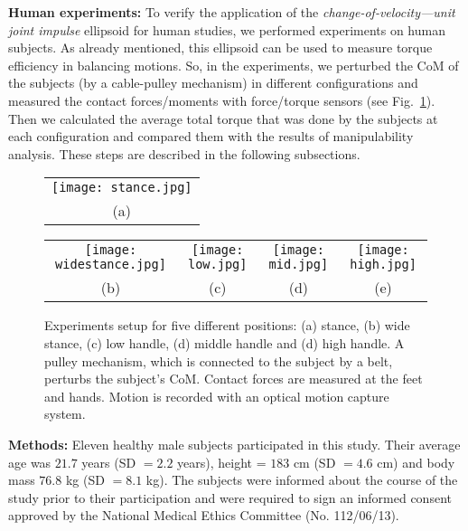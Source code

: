 \textbf{Human experiments:} To verify the application of the \textit{change-of-velocity---unit joint 	impulse} ellipsoid for human studies, we performed experiments on human subjects. As already mentioned, this ellipsoid can be used to measure torque efficiency in balancing motions. So, in the experiments, we perturbed the CoM of the subjects (by a cable-pulley mechanism) in different configurations and measured the contact forces/moments with force/torque sensors (see Fig.~\ref{experimentsetup}). Then we calculated the average total torque that was done by the subjects at each configuration and compared them with the results of manipulability analysis. These steps are described in the following subsections.

\begin{figure}
	\centering
	\begin{tabular}{c}
		\texttt{[image: stance.jpg]} \\
		(a)\\
		
	\end{tabular}
	\centering
	\begin{tabular}{cccc}
		\texttt{[image: widestance.jpg]} &
		\texttt{[image: low.jpg]} &
		\texttt{[image: mid.jpg]} &
		\texttt{[image: high.jpg]} \\
		(b) & (c) & (d) & (e)
	\end{tabular}
	\caption{Experiments setup for five different positions: (a) stance, (b) wide stance, (c) low handle, (d) middle handle and (d) high handle. A pulley mechanism, which is connected to the subject by a belt, perturbs the subject's CoM. Contact forces are measured at the feet and hands. Motion is recorded with an optical motion capture system.}
	\label{experimentsetup}
\end{figure}


\textbf{Methods:} Eleven healthy male subjects participated in this study. Their average age was $21.7$ years (SD $=2.2$ years), height = $183$ cm (SD $=4.6$ cm) and body mass $76.8$ kg (SD $=8.1$ kg). The subjects were informed about the course of the study prior to their participation and were required to sign an informed consent approved by the National Medical Ethics Committee (No. 112/06/13).

